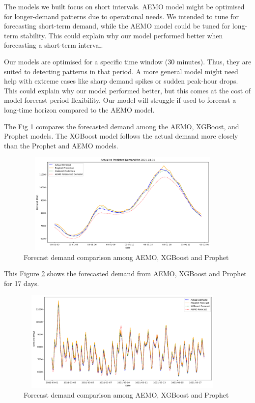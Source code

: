 \documentclass[mstat,12pt]{unswthesis}
\begin{document}
The models we built focus on short intervals. AEMO model might be
optimised for longer-demand patterns due to operational needs. We
intended to tune for forecasting short-term demand, while the AEMO model
could be tuned for long-term stability. This could explain why our model
performed better when forecasting a short-term interval.

Our models are optimised for a specific time window (30 minutes). Thus,
they are suited to detecting patterns in that period. A more general
model might need help with extreme cases like sharp demand spikes or
sudden peak-hour drops. This could explain why our model performed
better, but this comes at the cost of model forecast period flexibility.
Our model will struggle if used to forecast a long-time horizon compared
to the AEMO model.

The Fig \ref{AEMO_Prophet_XGBoost} compares the forecasted demand among
the AEMO, XGBoost, and Prophet models. The XGBoost model follows the
actual demand more closely than the Prophet and AEMO models.

\begin{figure}[H]
\centering
\includegraphics[width=0.95\textwidth, height=5cm]{AEMO_Prophet_XGBoost.png}
\caption{Forecast demand comparison among AEMO, XGBoost and Prophet}\label{AEMO_Prophet_XGBoost}
\end{figure}

This Figure \ref{AEMO_Prophet_XGBoost_17} shows the forecasted demand
from AEMO, XGBoost and Prophet for 17 days.

\begin{figure}[H]
\centering
\includegraphics[width=0.95\textwidth, height=5cm]{AEMO_Prophet_XGBoost_17.png}
\caption{Forecast demand comparison among AEMO, XGBoost and Prophet}\label{AEMO_Prophet_XGBoost_17}
\end{figure}
\end{document}
